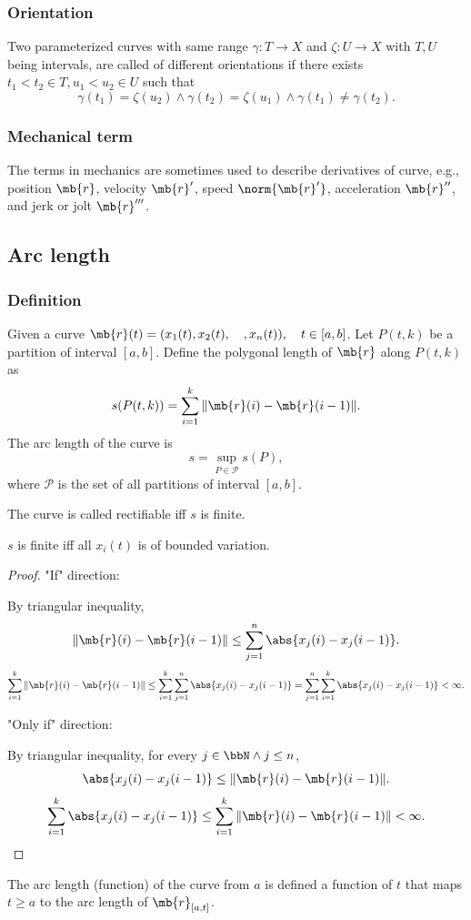 \documentclass[a4paper,12pt]{report}
\begin{document}
\begin{itemize}
\begin{itemize}
\subsubsection{Orientation}
Two parameterized curves with same range $\gamma\colon T\to X$ and $\zeta\colon U\to X$ with $T,U$ being intervals, are called of different orientations if there exists $t_1<t_2\in T,u_1<u_2\in U$ such that
\[\gamma(t_1)=\zeta(u_2)\land\gamma(t_2)=\zeta(u_1)\land\gamma(t_1)\neq\gamma(t_2).\]
\subsubsection{Mechanical term}
The terms in mechanics are sometimes used to describe derivatives of curve, e.g., position $\mb{r}$, velocity $\mb{r}'$, speed $\norm{\mb{r}'}$, acceleration $\mb{r}''$, and jerk or jolt $\mb{r}'''$.
\subsection{Arc length}
\subsubsection{Definition}
Given a curve $\mb{r}(t)=(x_1(t),x_2(t),\quad,x_n(t)),\quad t\in[a,b]$. Let $P(t,k)$ be a partition of interval $[a,b]$. Define the polygonal length of $\mb{r}$ along $P(t,k)$ as
\[s(P(t,k))=\sum_{i=1}^k\|\mb{r}(i)-\mb{r}(i-1)\|.\]
The arc length of the curve is
\[s=\sup_{P\in\mathcal{P}}s(P),\]
where $\mathcal{P}$ is the set of all partitions of interval $[a,b]$.

The curve is called rectifiable iff $s$ is finite.

$s$ is finite iff all $x_i(t)$ is of bounded variation.
\begin{proof}
"If" direction:

By triangular inequality,
\[\|\mb{r}(i)-\mb{r}(i-1)\|\leq\sum_{j=1}^n\abs{x_j(i)-x_j(i-1)}.\]
\[\sum_{i=1}^k\|\mb{r}(i)-\mb{r}(i-1)\|\leq\sum_{i=1}^k\sum_{j=1}^n\abs{x_j(i)-x_j(i-1)}=\sum_{j=1}^n\sum_{i=1}^k\abs{x_j(i)-x_j(i-1)}<\infty.\]

"Only if" direction:

By triangular inequality, for every $j\in\bbN\land j\leq n$,
\[\abs{x_j(i)-x_j(i-1)}\leq\|\mb{r}(i)-\mb{r}(i-1)\|.\]
\[\sum_{i=1}^k\abs{x_j(i)-x_j(i-1)}\leq\sum_{i=1}^k\|\mb{r}(i)-\mb{r}(i-1)\|<\infty.\]
\end{proof}

The arc length (function) of the curve from $a$ is defined a function of $t$ that maps $t\geq a$ to the arc length of $\mb{r}_{[a,t]}$.

\end{itemize}
\end{itemize}
\end{document}
